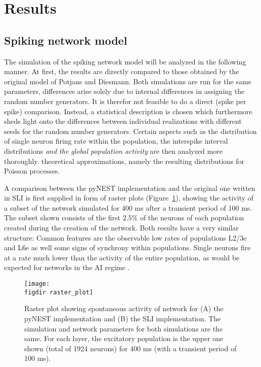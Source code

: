 \section{Results}
\label{sec:results}

\subsection{Spiking network model}
The simulation of the spiking network model will be analyzed in the following manner. 
At first, the results are directly compared to those obtained by the original 
model of Potjans and Diesmann. Both simulations are run for the same parameters, 
differences arise solely due to internal differences in assigning the random 
number generators. It is therefor not feasible to do a direct (spike per spike) 
comparison. Instead, a statistical description is chosen which furthermore sheds light
onto the differences between individual realizations with different seeds for the 
random number generators. Certain aspects such as
the distribution of single neuron firing rate within the population, 
the interspike interval distributions 
\emph{and the global population activity} 
are then analyzed more thoroughly. 
theoretical approximations, namely the resulting distributions 
for Poisson processes.

A comparison between the pyNEST implementation and the original one written in SLI
is first supplied in form of raster plots (Figure~\ref{fig:raster_plot}), 
showing the activity of a subset of the network simulated for 400 ms 
after a transient period of 100 ms. The subset shown consists of the first 
$2.5 \%$ of the neurons of each population created during the creation of the network. 
Both results have a very similar structure: Common features are the observable low 
rates of populations L2/3e and L6e as well some signs of synchrony within populations. 
Single neurons fire at a rate much lower than the activity of the 
entire population, as would be expected for networks in the AI regime \cite{brunel2000}. 
\begin{figure}[htpb]
    \centering
    \texttt{[image: \\figdir raster\_plot]}
    \caption{Raster plot showing spontaneous activity of network for 
        (A) the pyNEST implementation and (B) the SLI implementation.
        The simulation and network parameters for both simulations are 
        the same. 
        For each layer, the excitatory population is the upper one shown 
        (total of 1924 neurons) for $400$ ms (with a transient period of 100 ms). 
    }
    \label{fig:raster_plot}
\end{figure}

